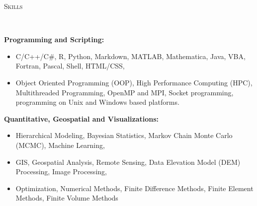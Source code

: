 \documentclass[10pt]{article}
\newenvironment{changemargin}[2]{%
  \begin{list}{}{%
 \setlength{\topsep}{0pt}%
 \setlength{\leftmargin}{#1}%
 \setlength{\rightmargin}{#2}%
 \setlength{\listparindent}{\parindent}%
 \setlength{\itemindent}{\parindent}%
 \setlength{\parsep}{\parskip}%
  }%
  \item[]}{\end{list}
}
\newcommand{\lineover}{
  \begin{changemargin}{-0.05in}{-0.05in}
  \vspace*{-8pt}
  \hrulefill \\
  \vspace*{-2pt}
  \end{changemargin}
}
\newcommand{\header}[1]{
  \begin{changemargin}{-0.5in}{-0.5in}
  \scshape{#1}\\
  \lineover
  \end{changemargin}
}
\newenvironment{body} {
  \vspace*{-2pt}
  \begin{changemargin}{-0.5in}{-0.5in}
}
{\end{changemargin}
}
\begin{document}
\medskip

\header{Skills}

\begin{body}
  \textbf{Programming and Scripting:} \\
  \vspace*{-4pt}
  \begin{itemize} \itemsep -0pt
    \item[] C/C++/C\#, R, Python, Markdown, MATLAB, Mathematica, Java, VBA, Fortran, Pascal, Shell, HTML/CSS,\\
    \item[] Object Oriented Programming (OOP), High Performance Computing (HPC), Multithreaded Programming,  OpenMP and MPI, Socket programming, programming on Unix and Windows based platforms.\\
  \end{itemize}

  \textbf{Quantitative, Geospatial and Visualizations:} \\
  \vspace*{-4pt}
  \begin{itemize} \itemsep -0pt
    \item[] Hierarchical Modeling, Bayesian Statistics, Markov Chain Monte Carlo (MCMC), Machine Learning, \\
    \item[] GIS, Geospatial Analysis, Remote Sensing, Data Elevation Model (DEM) Processing, Image Processing, \\
    \item[] Optimization, Numerical Methods, Finite Difference Methods, Finite Element Methods, Finite Volume Methods \\
  \end{itemize}

\end{body}
\end{document}
